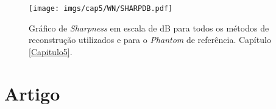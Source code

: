 \begin{figure}[t!]
	\caption{Gráfico de \textit{Sharpness} em escala de dB para todos os métodos de reconstrução utilizados e para o \textit{Phantom} de referência. Capítulo \ref{Capitulo5}.}
	\begin{center}
		\texttt{[image: imgs/cap5/WN/SHARPDB.pdf]}
	\end{center}
	\label{fig:imgCap5GraficoSHARPDB}
\end{figure}

\chapter{Artigo}\label{Artigo}



